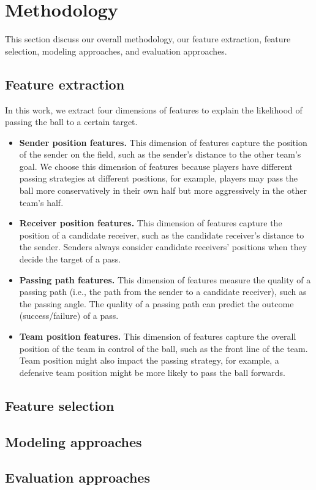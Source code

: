 \section{Methodology} \label{methodology}
This section discuss our overall methodology, our feature extraction, feature selection, modeling approaches, and evaluation approaches.

\subsection{Feature extraction}

In this work, we extract four dimensions of features to explain the likelihood of passing the ball to a certain target.
\begin{itemize}
	\item \textbf{Sender position features.} This dimension of features capture the position of the sender on the field, such as the sender's distance to the other team's goal. We choose this dimension of features because players have different passing strategies at different positions, for example, players may pass the ball more conservatively in their own half but more aggressively in the other team's half.
	\item \textbf{Receiver position features.} This dimension of features capture the position of a candidate receiver, such as the candidate receiver's distance to the sender. Senders always consider candidate receivers' positions when they decide the target of a pass.
	\item \textbf{Passing path features.} This dimension of features measure the quality of a passing path (i.e., the path from the sender to a candidate receiver), such as the passing angle. The quality of a passing path can predict the outcome (success/failure) of a pass.
	\item \textbf{Team position features.} This dimension of features capture the overall position of the team in control of the ball, such as the front line of the team. Team position might also impact the passing strategy, for example, a defensive team position might be more likely to pass the ball forwards.
\end{itemize}

\subsection{Feature selection}

\subsection{Modeling approaches}



\subsection{Evaluation approaches}